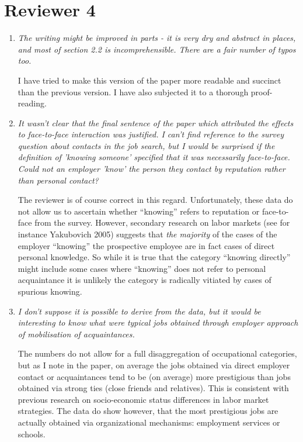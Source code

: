 \documentclass[11pt]{article}
\begin{document}
\section{Reviewer 4}
\begin{enumerate}
\item 	\emph{The writing might be improved in parts - it is very dry and abstract in places, and most of section 2.2 is incomprehensible. There are a fair number of typos too.}

I have tried to make this version of the paper more readable and succinct than the previous version.  I have also subjected it to a thorough proof-reading.

\item \emph{It wasn't clear that the final sentence of the paper which attributed the effects to face-to-face interaction was justified. I can't find reference to the survey question about contacts in the job search, but I would be surprised if the definition of 'knowing someone' specified that it was necessarily face-to-face. Could not an employer 'know' the person they contact by reputation rather than personal contact?}

The reviewer is of course correct in this regard.  Unfortunately, these data do not allow us to ascertain whether ``knowing'' refers to reputation or face-to-face from the survey.  However, secondary research on labor markets (see for instance Yakubovich 2005) suggests that \emph{the majority} of the cases of the employer ``knowing'' the prospective employee are in fact cases of direct personal knowledge.    So while it is true that the category ``knowing directly'' might include some cases where ``knowing'' does not refer to personal acquaintance it is unlikely the category is radically vitiated by cases of spurious knowing. 

\item \emph{I don't suppose it is possible to derive from the data, but it would be interesting to know what were typical jobs obtained through employer approach of mobilisation of acquaintances.}

The numbers do not allow for a full disaggregation of occupational categories, but as I note in the paper, on average the jobs obtained via direct employer contact or acquaintances tend to be (on average) more prestigious than jobs obtained via strong ties (close friends and relatives).  This is consistent with previous research on socio-economic status differences in labor market strategies.   The data do show however, that the most prestigious jobs are actually obtained via organizational mechanisms: employment services or schools.
\end{enumerate}
\end{document}
